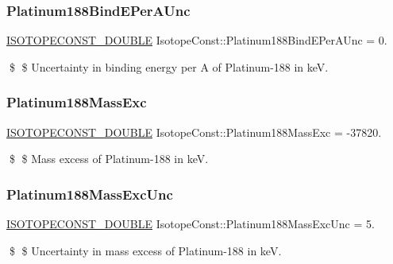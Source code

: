 \subsubsection{\texorpdfstring{Platinum188\+Bind\+E\+Per\+A\+Unc}{Platinum188BindEPerAUnc}}
{\footnotesize\ttfamily \mbox{\hyperlink{group___isotope_const-_macros_ga8f45a7272ce02c0b4c65c44636ed719a}{I\+S\+O\+T\+O\+P\+E\+C\+O\+N\+S\+T\+\_\+\+D\+O\+U\+B\+LE}} Isotope\+Const\+::\+Platinum188\+Bind\+E\+Per\+A\+Unc = 0.}

\$ \$ Uncertainty in binding energy per A of Platinum-\/188 in keV. \mbox{\label{group___isotope_const-_platinum-_pt188_ga02fcd9de859e6f3f1b3e421b607fd0c3}} 
\subsubsection{\texorpdfstring{Platinum188\+Mass\+Exc}{Platinum188MassExc}}
{\footnotesize\ttfamily \mbox{\hyperlink{group___isotope_const-_macros_ga8f45a7272ce02c0b4c65c44636ed719a}{I\+S\+O\+T\+O\+P\+E\+C\+O\+N\+S\+T\+\_\+\+D\+O\+U\+B\+LE}} Isotope\+Const\+::\+Platinum188\+Mass\+Exc = -\/37820.}

\$ \$ Mass excess of Platinum-\/188 in keV. \mbox{\label{group___isotope_const-_platinum-_pt188_ga54e7b27cb46287b32176693d93da7c16}} 
\subsubsection{\texorpdfstring{Platinum188\+Mass\+Exc\+Unc}{Platinum188MassExcUnc}}
{\footnotesize\ttfamily \mbox{\hyperlink{group___isotope_const-_macros_ga8f45a7272ce02c0b4c65c44636ed719a}{I\+S\+O\+T\+O\+P\+E\+C\+O\+N\+S\+T\+\_\+\+D\+O\+U\+B\+LE}} Isotope\+Const\+::\+Platinum188\+Mass\+Exc\+Unc = 5.}

\$ \$ Uncertainty in mass excess of Platinum-\/188 in keV. \mbox{\label{group___isotope_const-_platinum-_pt188_ga2b11a31bd2c0819d30f0de3085119dd6}} 
